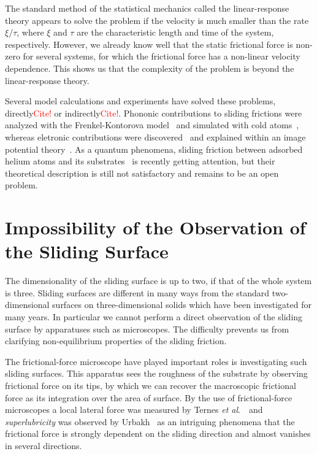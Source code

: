 The standard method of the statistical mechanics called the linear-response theory appears to solve the problem if the velocity is much smaller than the rate $\xi/\tau$, where $\xi$ and $\tau$ are the characteristic length and time of the system, respectively. However, we already know well that the static frictional force is non-zero for several systems, for which the frictional force has a non-linear velocity dependence. This shows us that the complexity of the problem is beyond the linear-response theory.

Several model calculations and experiments have solved these problems, directly\textcolor{red}{Cite!} or indirectly\textcolor{red}{Cite!}. Phononic contributions to sliding frictions were analyzed with the Frenkel-Kontorova model~\cite{Weiss1996,Weiss1997,Strunz1998a,Strunz1998,Novaco2015b,Novaco2015a,Meng2015} and simulated with cold atoms~\cite{Garcia-Mata2007,Meyer2015,Bylinskii2016}, whereas eletronic contributions were discovered~\cite{Dayo1998} and explained within an image potential theory~\cite{Novotny1999}. As a quantum phenomena, sliding friction between adsorbed helium atoms and its substrates~\cite{Hosomi2007,Hosomi2008,Hosomi2009} is recently getting attention, but their theoretical description is still not satisfactory and remains to be an open problem.

\section{Impossibility of the Observation of the Sliding Surface}\label{sec:IMPObsSlSf}
The dimensionality of the sliding surface is up to two, if that of the whole system is three. Sliding surfaces are different in many ways from the standard two-dimensional surfaces on three-dimensional solids which have been investigated for many years. In particular we cannot perform a direct observation of the sliding surface by apparatuses such as microscopes. The difficulty prevents us from clarifying non-equilibrium properties of the sliding friction.

The frictional-force microscope have played important roles is investigating such sliding surfaces. This apparatus sees the roughness of the substrate by observing frictional force on its tips, by which we can recover the macroscopic frictional force as its integration over the area of surface. By the use of frictional-force microscopes a local lateral force was measured by Ternes \textit{et al}.~\cite{Ternes2008}\ and \textit{superlubricity} was observed by Urbakh~\cite{Urbakh2010} as an intriguing phenomena that the frictional force is strongly dependent on the sliding direction and almost vanishes in several directions.

